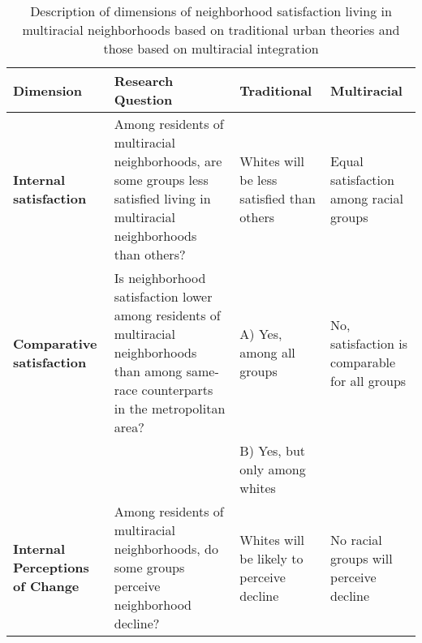


\begin{sidewaystable}
\caption{Description of dimensions of neighborhood satisfaction living in multiracial neighborhoods based on traditional urban theories and those based on multiracial integration}
\label{tab:theory}
\begin{tabular}{L{2in}L{2in}L{2in}L{2in}}
\textbf{Dimension} & \textbf{Research Question} & \textbf{Traditional} & \textbf{Multiracial} \\\toprule
\textbf{Internal satisfaction} & Among residents of multiracial neighborhoods, are some groups less satisfied living in multiracial neighborhoods than others? & Whites will be less satisfied than others & Equal satisfaction among racial groups \\\midrule
\textbf{Comparative satisfaction} & Is neighborhood satisfaction lower among residents of multiracial neighborhoods than among same-race counterparts in the metropolitan area? & A) Yes, among all groups & No, satisfaction is comparable for all groups \\
&  & B) Yes, but only among whites & \\\midrule
\textbf{Internal Perceptions of Change} & Among residents of multiracial neighborhoods, do some groups perceive neighborhood decline? & Whites will be likely to perceive decline & No racial groups will perceive decline \\\bottomrule
\end{tabular}
\end{sidewaystable}